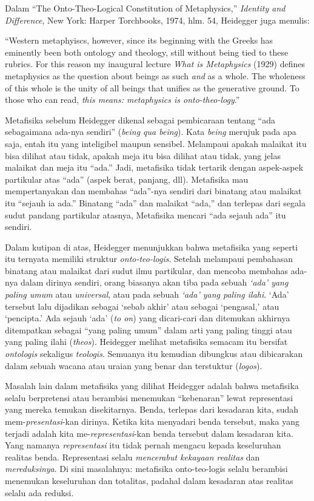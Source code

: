 \documentclass[10pt,a4paper]{article}
\renewenvironment{quote}
{\list{}{%
       \leftmargin 1.5em 
       \rightmargin 0em}
   \item\relax}
{\endlist}
\begin{document}
\begin{multicols}{2}
Dalam ``The Onto-Theo-Logical Constitution of Metaphysics,''
\emph{Identity and Difference}, New York: Harper Torchbooks, 1974, hlm.
54, Heidegger juga menulis:

\begin{quote}
``Western metaphyiscs, however, since its beginning with the Greeks has
eminently been both ontology and theology, still without being tied to
these rubrics. For this reason my inaugural lecture \emph{What is
Metaphysics} (1929) defines metaphysics as the question about beings as
such \emph{and} as a whole. The wholeness of this whole is the unity of
all beings that unifies as the generative ground. To those who can read,
\emph{this means: metaphysics is onto-theo-logy}.''
\end{quote}

Metafisika sebelum Heidegger dikenal sebagai pembicaraan tentang ``ada
sebagaimana ada-nya sendiri'' (\emph{being qua being}). Kata
\emph{being} merujuk pada apa saja, entah itu yang inteligibel maupun
sensibel. Melampaui apakah malaikat itu bisa dilihat atau tidak, apakah
meja itu bisa dilihat atau tidak, yang jelas malaikat dan meja itu
``ada.'' Jadi, metafisika tidak tertarik dengan aspek-aspek partikular
atas ``ada'' (aspek berat, panjang, dll). Metafisika mau mempertanyakan
dan membahas ``ada''-nya sendiri dari binatang atau malaikat itu
``sejauh ia ada.'' Binatang ``ada'' dan malaikat ``ada,'' dan terlepas
dari segala sudut pandang partikular atasnya, Metafisika mencari ``ada
sejauh ada'' itu sendiri.

Dalam kutipan di atas, Heidegger menunjukkan bahwa metafisika yang
seperti itu ternyata memiliki struktur \emph{onto-teo-logis}. Setelah
melampaui pembahasan binatang atau malaikat dari sudut ilmu partikular,
dan mencoba membahas ada-nya dalam dirinya sendiri, orang biasanya akan
tiba pada sebuah \emph{`ada' yang paling umum} atau \emph{universal},
atau pada sebuah \emph{`ada' yang paling ilahi}. `Ada' tersebut lalu
dijadikan sebagai `sebab akhir' atau sebagai `pengasal,' atau
`pencipta.' Ada sejauh `ada' (\emph{to on}) yang dicari-cari dan
ditemukan akhirnya ditempatkan sebagai ``yang paling umum'' dalam arti
yang paling tinggi atau yang paling ilahi (\emph{theos}). Heidegger
melihat metafisika semacam itu bersifat \emph{ontologis} sekaligus
\emph{teologis}. Semuanya itu kemudian dibungkus atau dibicarakan dalam
sebuah wacana atau uraian yang benar dan terstuktur (\emph{logos}).

Masalah lain dalam metafisika yang dilihat Heidegger adalah bahwa
metafisika selalu berpretensi atau berambisi menemukan ``kebenaran''
lewat representasi yang mereka temukan disekitarnya. Benda, terlepas
dari kesadaran kita, sudah mem-\emph{presentasi}-kan dirinya. Ketika
kita menyadari benda tersebut, maka yang terjadi adalah kita
me-\emph{representasi}-kan benda tersebut dalam kesadaran kita. Yang
namanya \emph{representasi} itu tidak pernah mengacu kepada keseluruhan
realitas benda. Representasi selalu \emph{mencerabut kekayaan realitas}
dan \emph{mereduksinya}. Di sini masalahnya: metafisika onto-teo-logis
selalu berambisi menemukan keseluruhan dan totalitas, padahal dalam
kesadaran atas realitas selalu ada reduksi.


\end{multicols}
\end{document}
